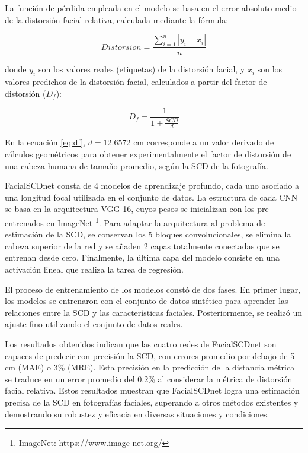 La función de pérdida empleada en el modelo se basa en el error absoluto medio de la distorsión facial relativa, calculada mediante la fórmula:

\begin{equation}
	Distorsion = \frac{\sum_{i=1}^{n} |y_i - x_i|}{n}
\end{equation}

donde $y_i$ son los valores reales (etiquetas) de la distorsión facial, y $x_i$ son los valores predichos de la distorsión facial, calculados a partir del factor de distorsión ($D_f$):

\begin{equation}
	D_f = \frac{1}{1 + \frac{SCD}{d}}
	\label{eq:df}
\end{equation}

En la ecuación \ref{eq:df}, $d = 12.6572 $ cm corresponde a un valor derivado de cálculos geométricos \cite{55} para obtener experimentalmente el factor de distorsión de una cabeza humana de tamaño promedio, según la SCD de la fotografía.

FacialSCDnet consta de 4 modelos de aprendizaje profundo, cada uno asociado a una longitud focal utilizada en el conjunto de datos. La estructura de cada CNN se basa en la arquitectura VGG-16, cuyos pesos se inicializan con los pre-entrenados en ImageNet \footnote{ImageNet: https://www.image-net.org/}. Para adaptar la arquitectura al problema de estimación de la SCD, se conservan los 5 bloques convolucionales, se elimina la cabeza superior de la red y se añaden 2 capas totalmente conectadas que se entrenan desde cero. Finalmente, la última capa del modelo consiste en una activación lineal que realiza la tarea de regresión.

El proceso de entrenamiento de los modelos constó de dos fases. En primer lugar, los modelos se entrenaron con el conjunto de datos sintético para aprender las relaciones entre la SCD y las características faciales. Posteriormente, se realizó un ajuste fino utilizando el conjunto de datos reales.

Los resultados obtenidos indican que las cuatro redes de FacialSCDnet son capaces de predecir con precisión la SCD, con errores promedio por debajo de 5 cm (MAE) o 3\% (MRE). Esta precisión en la predicción de la distancia métrica se traduce en un error promedio del 0.2\% al considerar la métrica de distorsión facial relativa. Estos resultados muestran que FacialSCDnet logra una estimación precisa de la SCD en fotografías faciales, superando a otros métodos existentes y demostrando su robustez y eficacia en diversas situaciones y condiciones.